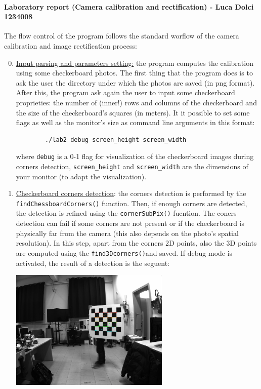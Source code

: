 \documentclass[11pt, a4paper]{toptesi}
\begin{document}
\paragraph{Laboratory report (Camera calibration and rectification) - Luca Dolci
    1234008}
The flow control of the program follows the standard worflow of the camera
calibration and image rectification process:
\begin{enumerate} \setcounter{enumi}{-1}
    \item \underline{Input parsing and parameters setting:} the program computes
        the calibration using some checkerboard photos. The first thing that
        the program does is to ask the user the directory under which the
        photos are saved (in png format). After this, the program ask again the
        user to input some checkerboard proprieties: the number of (inner!) rows
        and columns of the checkerboard and the size of the checkerboard's
        squares (in
        meters). 
        It it possible to set some flags as well as the monitor's size as
        command line arguments in this format:
        \begin{verbatim}
        ./lab2 debug screen_height screen_width
        \end{verbatim}
        where \texttt{debug} is a 0-1 flag for visualization of the checkerboard
        images during corners detection, \texttt{screen_height} and 
        \texttt{screen_width} are the dimensions of your monitor 
        (to adapt the visualization). 
    
    \item \underline{Checkerboard corners detection}: the corners detection is
        performed by the \\
        \texttt{findChessboardCorners()} function. Then,
        if enough corners are detected, the detection is refined using the
        \texttt{cornerSubPix()} fucntion. The coners detection can fail
        if some corners are not present or if the checkerboard
        is physically far from the camera (this also depends on the photo's
        spatial resolution). In this step, apart from the corners 2D points, also
        the 3D points are computed using the
        \texttt{find3Dcorners()}and saved. If debug mode is activated, the result of a detection is the seguent:
        \begin{center}
        \includegraphics[width=0.6\textwidth]{./checkerboard_corner_detection.png}
        \end{center}


\end{enumerate}
\end{document}
